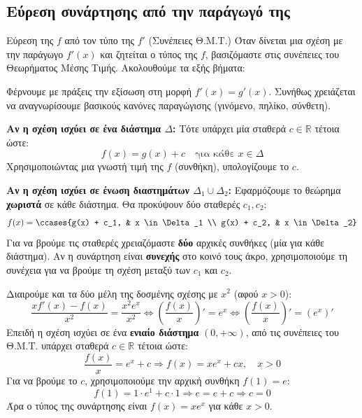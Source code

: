 \subsection{Εύρεση συνάρτησης από την παράγωγό της}
\begin{askhsh}{Εύρεση της $ f $ από τον τύπο της $ f' $ (Συνέπειες Θ.Μ.Τ.)}
Όταν δίνεται μια σχέση με την παράγωγο $ f'(x) $ και ζητείται ο τύπος της $ f $, βασιζόμαστε στις συνέπειες του Θεωρήματος Μέσης Τιμής. Ακολουθούμε τα εξής βήματα:

\bhmata
\begin{bhma}
\item Φέρνουμε με πράξεις την εξίσωση στη μορφή $f'(x) = g'(x)$. Συνήθως χρειάζεται να αναγνωρίσουμε βασικούς κανόνες παραγώγισης (γινόμενο, πηλίκο, σύνθετη).
\item \textbf{Αν η σχέση ισχύει σε \textbf{ένα} διάστημα $\Delta$:}
Τότε υπάρχει μία σταθερά $c \in \mathbb{R}$ τέτοια ώστε:
\[ f(x) = g(x) + c \quad \text{για κάθε } x \in \Delta \]
Χρησιμοποιώντας μια γνωστή τιμή της $f$ (συνθήκη), υπολογίζουμε το $c$.
\item \textbf{Αν η σχέση ισχύει σε \textbf{ένωση} διαστημάτων $\Delta_1 \cup \Delta_2$:}
Εφαρμόζουμε το θεώρημα \textbf{χωριστά} σε κάθε διάστημα. Θα προκύψουν δύο σταθερές $c_1, c_2$:
\[ f(x) = \ccases{g(x) + c_1, & x \in \Delta_1 \\ g(x) + c_2, & x \in \Delta_2} \]
Για να βρούμε τις σταθερές χρειαζόμαστε \textbf{δύο} αρχικές συνθήκες (μία για κάθε διάστημα). Αν η συνάρτηση είναι \textbf{συνεχής} στο κοινό τους άκρο, χρησιμοποιούμε τη συνέχεια για να βρούμε τη σχέση μεταξύ των $c_1$ και $c_2$.
\end{bhma}
\end{askhsh}


\lysh
Διαιρούμε και τα δύο μέλη της δοσμένης σχέσης με $x^2$ (αφού $x > 0$):
\[
\frac{x f'(x) - f(x)}{x^2} = \frac{x^2 e^x}{x^2} \Leftrightarrow
\left(\frac{f(x)}{x}\right)' = e^x \Leftrightarrow
\left(\frac{f(x)}{x}\right)' = (e^x)'
\]
Επειδή η σχέση ισχύει σε ένα \textbf{ενιαίο διάστημα} $(0, +\infty)$, από τις συνέπειες του Θ.Μ.Τ. υπάρχει σταθερά $c \in \mathbb{R}$ τέτοια ώστε:
\[ \frac{f(x)}{x} = e^x + c \Rightarrow f(x) = x e^x + c x, \quad x > 0 \]
Για να βρούμε το $c$, χρησιμοποιούμε την αρχική συνθήκη $f(1) = e$:
\[ f(1) = 1 \cdot e^1 + c \cdot 1 \Rightarrow e = e + c \Rightarrow c = 0 \]
Άρα ο τύπος της συνάρτησης είναι $f(x) = x e^x$ για κάθε $x > 0$.\\

